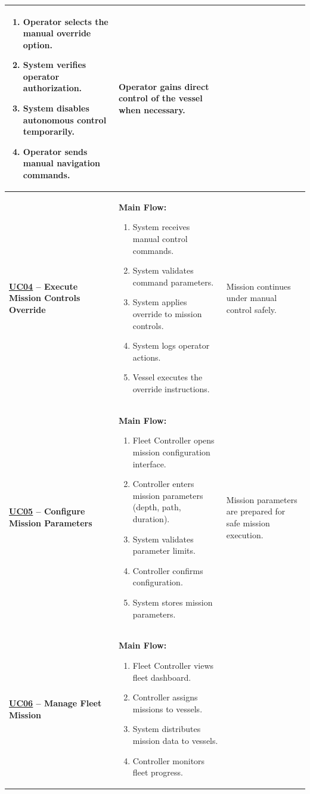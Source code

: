 \documentclass[11pt,a4paper]{article}
\let\orighyperref\hyperref
\renewcommand{\hyperref}[2][]{\orighyperref[#1]{\uline{#2}}}%
\begin{document}
\begin{longtable}{|>{\raggedright\arraybackslash}p{}|>{\raggedright\arraybackslash}p{}|>{\raggedright\arraybackslash}p{}|}
\begin{enumerate}[leftmargin=*,nosep]
  \item Operator selects the manual override option.
  \item System verifies operator authorization.
  \item System disables autonomous control temporarily.
  \item Operator sends manual navigation commands.
\end{enumerate} & Operator gains direct control of the vessel when necessary. \\
\hline
\textbf{\hyperref[fig:usecase-diagram-pdf]{UC04} -- Execute Mission Controls Override} & \textbf{Main Flow:}\begin{enumerate}[leftmargin=*,nosep]
  \item System receives manual control commands.
  \item System validates command parameters.
  \item System applies override to mission controls.
  \item System logs operator actions.
  \item Vessel executes the override instructions.
\end{enumerate} & Mission continues under manual control safely. \\
\hline
\textbf{\hyperref[fig:usecase-diagram-pdf]{UC05} -- Configure Mission Parameters} & \textbf{Main Flow:}\begin{enumerate}[leftmargin=*,nosep]
  \item Fleet Controller opens mission configuration interface.
  \item Controller enters mission parameters (depth, path, duration).
  \item System validates parameter limits.
  \item Controller confirms configuration.
  \item System stores mission parameters.
\end{enumerate} & Mission parameters are prepared for safe mission execution. \\
\hline
\textbf{\hyperref[fig:usecase-diagram-pdf]{UC06} -- Manage Fleet Mission} & \textbf{Main Flow:}\begin{enumerate}[leftmargin=*,nosep]
  \item Fleet Controller views fleet dashboard.
  \item Controller assigns missions to vessels.
  \item System distributes mission data to vessels.
  \item Controller monitors fleet progress.

\end{enumerate}
\end{longtable}
\end{document}
